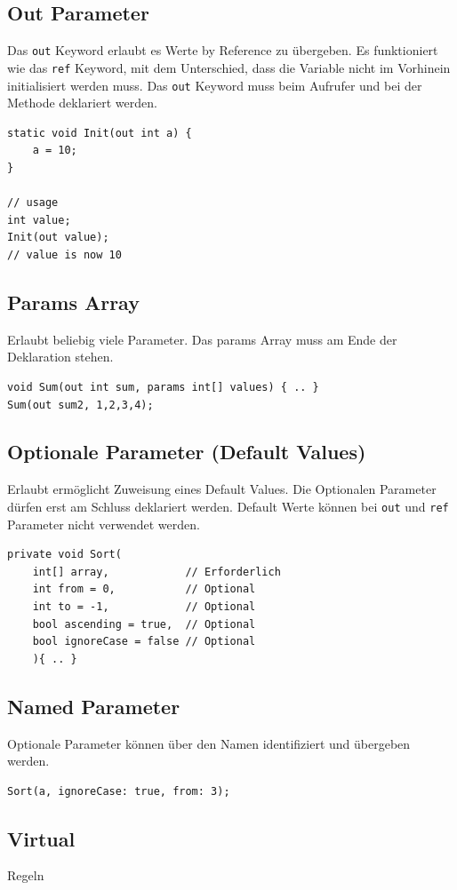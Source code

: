 \documentclass[
a4paper,
oneside,
10pt,
fleqn,
headsepline,
toc=listofnumbered, 
bibliography=totocnumbered]{scrartcl}
\begin{document}
\subsection{Out Parameter}
Das \lstinline|out| Keyword erlaubt es Werte by Reference zu übergeben. Es funktioniert wie das \lstinline|ref| Keyword, mit dem Unterschied, dass die Variable nicht im Vorhinein initialisiert werden muss. Das \lstinline|out| Keyword muss beim Aufrufer und bei der Methode deklariert werden.
\begin{lstlisting}
static void Init(out int a) {
	a = 10;
}

// usage
int value;
Init(out value); 
// value is now 10 
\end{lstlisting}

\subsection{Params Array}
Erlaubt beliebig viele Parameter. Das params Array muss am Ende der Deklaration stehen.
\begin{lstlisting}
void Sum(out int sum, params int[] values) { .. }
Sum(out sum2, 1,2,3,4);
\end{lstlisting}

\subsection{Optionale Parameter (Default Values)}
Erlaubt ermöglicht Zuweisung eines Default Values. Die Optionalen Parameter dürfen erst am Schluss deklariert werden. Default Werte können bei \lstinline|out| und \lstinline|ref| Parameter nicht verwendet werden.
\begin{lstlisting}
private void Sort(
	int[] array,            // Erforderlich
	int from = 0,           // Optional
	int to = -1,            // Optional
	bool ascending = true,  // Optional
	bool ignoreCase = false // Optional
	){ .. }
\end{lstlisting}

\subsection{Named Parameter}
Optionale Parameter können über den Namen identifiziert und übergeben werden.
\begin{lstlisting}
Sort(a, ignoreCase: true, from: 3);
\end{lstlisting}

\subsection{Virtual}
Regeln
\end{document}
